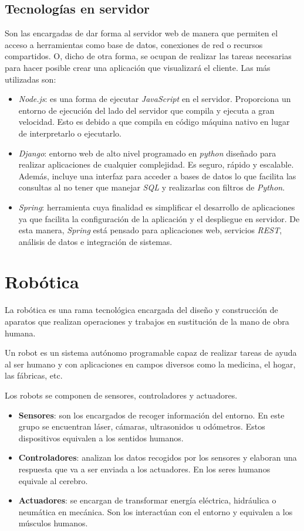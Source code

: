 \subsection{Tecnologías en servidor}
\label{subsec:tecserver}
Son las encargadas de dar forma al servidor web de manera que permiten el acceso a herramientas como base de datos, conexiones de red o recursos compartidos. O, dicho de otra forma, se ocupan de realizar las tareas necesarias para hacer posible crear una aplicación que visualizará el cliente. Las más utilizadas son: 
\begin{itemize}
    \item \textit{Node.js}: es una forma de ejecutar \textit{JavaScript} en el servidor. Proporciona un entorno de ejecución del lado del servidor que compila y ejecuta a gran velocidad. Esto es debido a que compila en código máquina nativo en lugar de interpretarlo o ejecutarlo.   
    \item \textit{Django}: entorno web de alto nivel programado en \textit{python} diseñado para realizar aplicaciones de cualquier complejidad. Es seguro, rápido y escalable. Además, incluye una interfaz para acceder a bases de datos lo que facilita las consultas al no tener que manejar \textit{SQL} y realizarlas con filtros de \textit{Python}.
    \item \textit{Spring}: herramienta cuya finalidad es simplificar el desarrollo de aplicaciones ya que facilita la configuración de la aplicación y el despliegue en servidor. De esta manera, \textit{Spring} está pensado para aplicaciones web, servicios \textit{REST}, análisis de datos e integración de sistemas. 
\end{itemize}

\section{Robótica}
\label{sec:robotica}
La robótica es una rama tecnológica encargada del diseño y construcción de aparatos que realizan operaciones y trabajos en sustitución de la mano de obra humana. 

Un robot es un sistema autónomo programable capaz de realizar tareas de ayuda al ser humano y con aplicaciones en campos diversos como la medicina, el hogar, las fábricas, etc. 

Los robots se componen de sensores, controladores y actuadores.
\begin{itemize}
    \item \textbf{Sensores}: son los encargados de recoger información del entorno. En este grupo se encuentran láser, cámaras, ultrasonidos u odómetros. Estos dispositivos equivalen a los sentidos humanos. 
    \item \textbf{Controladores}: analizan los datos recogidos por los sensores y elaboran una respuesta que va a ser enviada a los actuadores. En los seres humanos equivale al cerebro. 
    \item \textbf{Actuadores}: se encargan de transformar energía eléctrica, hidráulica o neumática en mecánica. Son los interactúan con el entorno y equivalen a los músculos humanos. 
\end{itemize}

